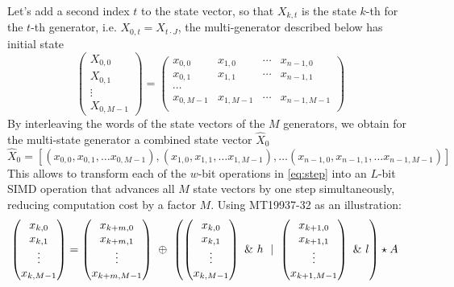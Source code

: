 \documentclass[preprint,1p,times]{elsarticle}
\begin{document}
Let's add a second index $t$ to the state vector, so that $X_{k,t}$ is the state $k$-th for the $t$-th generator, i.e. $X_{0,t}=X_{t \cdot J}$, the multi-generator described below has initial state
$$
\begin{pmatrix}
    X_{0,0} \\ X_{0,1} \\ \vdots \\ X_{0,M-1}
\end{pmatrix}
=
\begin{pmatrix}
    x_{0,0} & x_{1,0} & \cdots & x_{n-1,0} \\
    x_{0,1} & x_{1,1} & \cdots & x_{n-1,1} \\
    \cdots \\
    x_{0,M-1} & x_{1,M-1} & \cdots & x_{n-1,M-1} \\
\end{pmatrix}
$$
By interleaving the words of the state vectors of the $M$ generators, we obtain for the multi-state generator a combined state vector $\hat{X}_0$
$$
    \hat{X}_0 = [(x_{0,0}, x_{0,1}, \dots x_{0,M-1}), (x_{1,0}, x_{1,1}, \dots x_{1,M-1}), \dots (x_{n-1,0}, x_{n-1,1}, \dots x_{n-1,M-1})]
$$
This allows to transform each of the $w$-bit operations in \eqref{eq:step} into an $L$-bit SIMD operation that advances all $M$ state vectors by one step simultaneously, reducing computation cost by a factor $M$. Using MT19937-32 as an illustration:
\begin{align}
\label{eq:msmt19937}
\begin{pmatrix}x_{k,0} \\ x_{k,1} \\ \vdots \\ x_{k,M-1} \end{pmatrix}
&= \begin{pmatrix}x_{k+m, 0} \\ x_{k+m,1} \\ \vdots \\ x_{k+m,M-1} \end{pmatrix} ~\mathbin{\oplus}~ \left(\begin{pmatrix}x_{k,0} \\ x_{k,1} \\ \vdots \\ x_{k,M-1} \end{pmatrix}~\&~h ~\mid~ \begin{pmatrix}x_{k+1,0} \\ x_{k+1,1} \\ \vdots \\ x_{k+1,M-1}  \end{pmatrix}~\&~l\right) \star A
\end{align}
\end{document}
